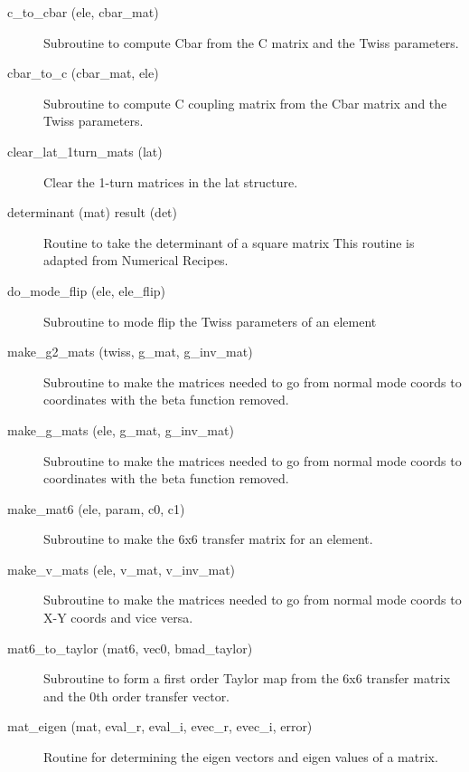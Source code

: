 \begin{description}

\item[c_to_cbar (ele, cbar_mat)] \Newline
Subroutine to compute Cbar from the C matrix and the Twiss parameters. 

\item[cbar_to_c (cbar_mat, ele)] \Newline
Subroutine to compute C coupling matrix from the Cbar matrix and the Twiss parameters. 

\item[clear_lat_1turn_mats (lat)] \Newline
Clear the 1-turn matrices in the lat structure. 

\item[determinant (mat) result (det)] \Newline 
Routine to take the determinant of a square matrix
This routine is adapted from Numerical Recipes.

\item[do_mode_flip (ele, ele_flip)] \Newline
Subroutine to mode flip the Twiss parameters of an element 

\item[make_g2_mats (twiss, g_mat, g_inv_mat)] \Newline
Subroutine to make the matrices needed to go from normal mode coords to 
coordinates with the beta function removed. 

\item[make_g_mats (ele, g_mat, g_inv_mat)] \Newline
Subroutine to make the matrices needed to go from normal mode coords to 
coordinates with the beta function removed. 

\item[make_mat6 (ele, param, c0, c1)] \Newline
Subroutine to make the 6x6 transfer matrix for an element. 

\item[make_v_mats (ele, v_mat, v_inv_mat)] \Newline
Subroutine to make the matrices needed to go from normal mode coords to X-Y 
coords and vice versa. 

\item[mat6_to_taylor (mat6, vec0, bmad_taylor)] \Newline
Subroutine to form a first order Taylor map from the 6x6 transfer matrix 
and the 0th order transfer vector. 

\item[mat_eigen (mat, eval_r, eval_i, evec_r, evec_i, error)] \Newline 
Routine for determining the eigen vectors and eigen values of a matrix.


\end{description}
